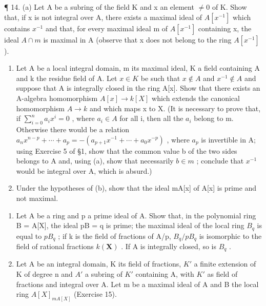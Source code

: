 ¶ 14. (a) Let A be a subring of the field K and x an element \(\neq0\) of K. Show that, if x is not integral over A, there exists a maximal ideal of \(A[x^{-1}]\) which contains \(x^{-1}\) and that, for every maximal ideal m of \(A[x^{-1}]\) containing x, the ideal \(A\cap m\) is maximal in A (observe that x does not belong to the ring \(A[x^{-1}]\) ).

\begin{enumerate}
\def\labelenumi{(\alph{enumi})}
\setcounter{enumi}{1}
\item
  Let A be a local integral domain, m its maximal ideal, K a field containing A and k the residue field of A. Let \(x \in K\) be such that \(x \notin A\) and \(x^{-1} \notin A\) and suppose that A is integrally closed in the ring A{[}x{]}. Show that there exists an A-algebra homomorphism \(A[x] \to k[X]\) which extends the canonical homomorphism \(A \to k\) and which maps x to X. (It is necessary to prove that, if \(\sum_{i=0}^{n}a_{i}x^{i}=0\) , where \(a_{i}\in A\) for all i, then all the \(a_{i}\) belong to m. Otherwise there would be a relation \(a_{n}x^{n-p}+\cdots+a_{p}=-(a_{p+1}x^{-1}+\cdots+a_{0}x^{-p})\) , where \(a_{p}\) is invertible in A; using Exercise 5 of §1, show that the common value b of the two sides belongs to A and, using (a), show that necessarily \(b\in m\) ; conclude that \(x^{-1}\) would be integral over A, which is absurd.)
\item
  Under the hypotheses of (b), show that the ideal mA{[}x{]} of A{[}x{]} is prime and not maximal.
\end{enumerate}

\begin{enumerate}
\def\labelenumi{\arabic{enumi}.}
\setcounter{enumi}{14}
\item
  Let A be a ring and p a prime ideal of A. Show that, in the polynomial ring B = A{[}X{]}, the ideal pB = q is prime; the maximal ideal of the local ring \(B_{q}\) is equal to \(pB_{q}\) ; if k is the field of fractions of A/p, \(B_{q}/pB_{q}\) is isomorphic to the field of rational fractions \(k(\mathbf{X})\) . If A is integrally closed, so is \(B_{q}\) .
\item
  Let A be an integral domain, K its field of fractions, \(K'\) a finite extension of K of degree n and \(A'\) a subring of \(K'\) containing A, with \(K'\) as field of fractions and integral over A. Let m be a maximal ideal of A and B the local ring \(A[X]_{mA[X]}\) (Exercise 15).
\end{enumerate}

